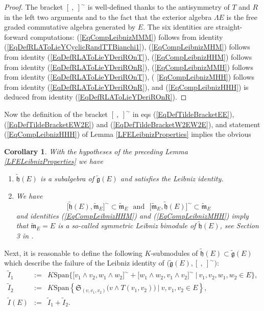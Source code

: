 \documentclass [11pt] {article}
\newtheorem {corollary} [lemma] {Corollary}
\theoremstyle{definition}
\begin{document}
\begin{proof} The bracket $[~,~]^\sim$ is well-defined thanks to the antisymmetry of $T$ and $R$ in the left two
	arguments and to the fact that the exterior algebra
	$\Lambda E$ is the free graded commutative algebra generated by $E$. The six identities are straight-forward computations:
	 (\ref{EqCompLeibnizMMM}) follows from identity (\ref{EqDefRLAToLieYCyclicRandTTBianchi1}),  (\ref{EqCompLeibnizMHM})
	follows from identity (\ref{EqDefRLAToLieYDeriROnT}),  (\ref{EqCompLeibnizHHM}) follows from identity (\ref{EqDefRLAToLieYDeriROnR}),
	 (\ref{EqCompLeibnizMMH}) follows from identity (\ref{EqDefRLAToLieYDeriROnT}), ( \ref{EqCompLeibnizMHH}) follows from identity (\ref{EqDefRLAToLieYDeriROnR}), and  (\ref{EqCompLeibnizHHH})
	is deduced from identity (\ref{EqDefRLAToLieYDeriROnR}).
\end{proof}
\noindent Now the definition of the bracket
$[~,~]^\sim$ in eqs (\ref{EqDefTildeBracketEE}),
(\ref{EqDefTildeBracketEW2E}) and (\ref{EqDefTildeBracketW2EW2E}), and statement
(\ref{EqCompLeibnizHHH}) of Lemma \ref{LFELeibnizProperties}
implies the obvious
\begin{corollary}\label{CHTildeLeibniz}
	With the hypotheses of the preceding Lemma
	\ref{LFELeibnizProperties} we have
	\begin{enumerate}
		\item $\tilde{\mathfrak{h}}(E)$ is a subalgebra
		  of $\tilde{\mathfrak{g}}(E)$ and satisfies the
		  Leibniz identity.
		 \item  We have
		   \begin{equation}
		    \big[\tilde{\mathfrak{h}}(E),
		    \tilde{\mathfrak{m}}_E\big]^\sim
		    \subset \tilde{\mathfrak{m}}_E
		    ~~~\mathrm{and}~~~
		    \big[\tilde{\mathfrak{m}}_E,
		    \tilde{\mathfrak{h}}(E)\big]^\sim
		    \subset \tilde{\mathfrak{m}}_E
		   \end{equation}
		   and identities (\ref{EqCompLeibnizHHM}) and (\ref{EqCompLeibnizMHH})
		   imply that $\tilde{\mathfrak{m}}_E=E$ is a so-called symmetric Leibniz bimodule of $\tilde{\mathfrak{h}}(E)$, see Section 3 in \cite{F}.
	\end{enumerate}
\end{corollary}
\noindent Next, it is reasonable to define the following $K$-submodules of $\tilde{\mathfrak{h}}(E)\subset \tilde{\mathfrak{g}}(E)$ which describe the failure of the Leibniz identity of
$\big(\tilde{\mathfrak{g}}(E),[~,~]^\sim\big)$:
\begin{eqnarray}
   \tilde{I}_1 & := &
      K\mathrm{Span}\Big\{
        \big[v_1\wedge v_2, w_1\wedge w_2\big]^\sim
        +\big[w_1\wedge w_2, v_1\wedge v_2\big]^\sim~
          \Big|~v_1,v_2,w_1,w_2\in E
      \Big\}, 
      \label{EqDefIdealOne}\\
   \tilde{I}_2 & := &
   K\mathrm{Span}\left\{
   \mathfrak{S}_{(v,v_1,v_2)}\big(v\wedge T(v_1,v_2)\big)~
   \big|~v,v_1,v_2\in E
   \right\}, \label{EqDefIdealTwo}\\ 
   \tilde{I}(E) & := &   \tilde{I}_1 +\tilde{I}_2.
          \label{EqDefIdealOnePlusIdealTwo}
\end{eqnarray}
\end{document}
